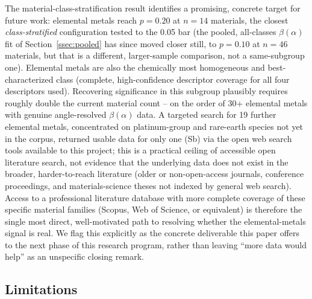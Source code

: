 \documentclass[aip,amsmath,amssymb,reprint]{revtex4-1}
\begin{document}
The material-class-stratification result identifies a promising,
concrete target for future work: elemental metals reach $p=0.20$ at
$n=14$ materials, the closest \emph{class-stratified} configuration
tested to the 0.05 bar (the pooled, all-classes $\beta(\alpha)$ fit of
Section~\ref{ssec:pooled} has since moved closer still, to $p=0.10$ at
$n=46$ materials, but that is a different, larger-sample comparison,
not a same-subgroup one). Elemental metals are also the chemically
most homogeneous and
best-characterized class (complete, high-confidence descriptor
coverage for all four descriptors used). Recovering significance in
this subgroup plausibly requires roughly double the current material
count -- on the order of 30+ elemental metals with genuine
angle-resolved $\beta(\alpha)$ data. A targeted search for 19 further
elemental metals, concentrated on platinum-group and rare-earth
species not yet in the corpus, returned usable data for only one (Sb)
via the open web search tools available to this project; this is a
practical ceiling of accessible open literature search, not evidence
that the underlying data does not exist in the broader, harder-to-reach
literature (older or non-open-access journals, conference proceedings,
and materials-science theses not indexed by general web search).
Access to a professional literature database with more complete
coverage of these specific material families (Scopus, Web of Science,
or equivalent) is therefore the single most direct, well-motivated
path to resolving whether the elemental-metals signal is real. We
flag this explicitly as the concrete deliverable this paper offers to
the next phase of this research program, rather than leaving ``more
data would help'' as an unspecific closing remark.

\subsection{Limitations}
\label{ssec:disc_limitations}
\end{document}
